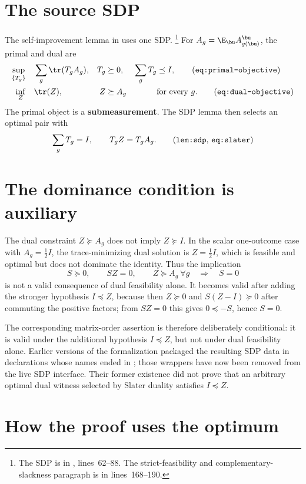 \documentclass[11pt]{article}
\begin{document}
\section{The source SDP}

The self-improvement lemma in \cite{Ji2020LowIndividualDegree} uses one SDP.%
\footnote{The SDP is in ,
lines~62--88.  The strict-feasibility and complementary-slackness paragraph is
in lines~168--190.}
For $A_g=\E_{\bu}A^{\bu}_{g(\bu)}$, the primal and dual are
\begin{align}
  \sup_{\{T_g\}}&\quad \sum_g\tr(T_gA_g),&
  T_g&\succeq0,& \sum_gT_g&\preceq I,\tag{\texttt{eq:primal-objective}}\\
  \inf_Z&\quad \tr(Z),&
  Z&\succeq A_g&&\text{for every }g.\tag{\texttt{eq:dual-objective}}
\end{align}
The primal object is a \textbf{submeasurement}.  The SDP lemma then selects an
optimal pair with
\[
  \sum_gT_g=I,
  \qquad
  T_gZ=T_gA_g.
  \tag{\texttt{lem:sdp}, \texttt{eq:slater}}
\]

\section{The dominance condition is auxiliary}

The dual constraint $Z\succeq A_g$ does not imply $Z\succeq I$.  In the scalar
one-outcome case with $A_g=\frac12 I$, the trace-minimizing dual solution is
$Z=\frac12 I$, which is feasible and optimal but does not dominate the identity.
Thus the implication
\[
  S\succeq0,\qquad SZ=0,\qquad Z\succeq A_g\ \forall g
  \quad\Longrightarrow\quad S=0
\]
is not a valid consequence of dual feasibility alone.  It becomes valid after
adding the stronger hypothesis $I\preceq Z$, because then $Z\succeq0$ and
$S(Z-I)\succeq0$ after commuting the positive factors; from $SZ=0$ this gives
$0\preceq -S$, hence $S=0$.

The corresponding matrix-order assertion is therefore deliberately conditional:
it is valid under the additional hypothesis $I\preceq Z$, but not under dual
feasibility alone.  Earlier versions of the formalization packaged the
resulting SDP data in declarations whose names ended in ;
those wrappers have now been removed from the live SDP interface.  Their former
existence did not prove that an arbitrary optimal dual witness selected by
Slater duality satisfies $I\preceq Z$.

\section{How the proof uses the optimum}
\end{document}
